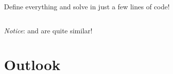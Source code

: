 \documentclass[10pt,utf8,compress,xcolor=dvipsnames]{beamer}
\begin{document}
\subsection{\PY}
\begin{frame}[fragile]{\insertsubsectionhead}
	Define everything and solve in just a few lines of code!\\[-0.15cm]
	\lstset{language = python}
	
	
\end{frame}
\subsection{\CPP}
\begin{frame}[fragile]{\insertsubsectionhead}
	
	{\em Notice}: \CPP and \PY are quite similar!\\[-0.15cm]
	\lstset{language = c++}
	
\end{frame}

\section{Outlook}
\end{document}
